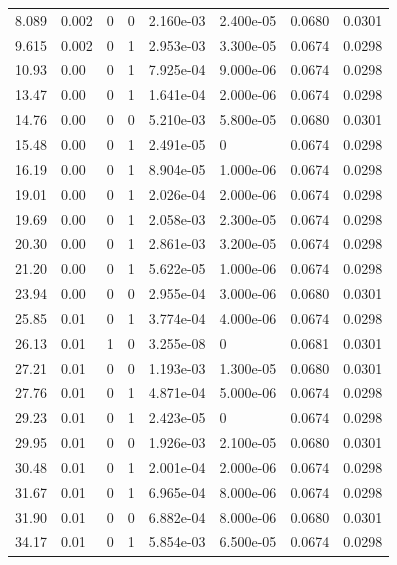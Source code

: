 \documentclass[preview]{standalone}
\begin{document}
{{\begin{tabular}{L{1.2cm}C{1.2cm} C{0.3cm}C{0.5cm} C{1.4cm}C{1.4cm} C{1.4cm}C{1.4cm}}
  8.089  &  0.002  & 0     &  0 &  2.160e-03  & 2.400e-05  & 0.0680 &  0.0301   \\ 
  9.615  &  0.002  & 0     &  1 &  2.953e-03  & 3.300e-05  & 0.0674 &  0.0298   \\ 
  10.93  &  0.00  & 0     &  1 &  7.925e-04  & 9.000e-06  & 0.0674 &  0.0298   \\ 
  13.47  &  0.00  & 0     &  1 &  1.641e-04  & 2.000e-06  & 0.0674 &  0.0298   \\ 
  14.76  &  0.00  & 0     &  0 &  5.210e-03  & 5.800e-05  & 0.0680 &  0.0301   \\ 
  15.48  &  0.00  & 0     &  1 &  2.491e-05  & 0  & 0.0674 &  0.0298   \\ 
  16.19  &  0.00  & 0     &  1 &  8.904e-05  & 1.000e-06  & 0.0674 &  0.0298   \\ 
  19.01  &  0.00  & 0     &  1 &  2.026e-04  & 2.000e-06  & 0.0674 &  0.0298   \\ 
  19.69  &  0.00  & 0     &  1 &  2.058e-03  & 2.300e-05  & 0.0674 &  0.0298   \\ 
  20.30  &  0.00  & 0     &  1 &  2.861e-03  & 3.200e-05  & 0.0674 &  0.0298   \\ 
  21.20  &  0.00  & 0     &  1 &  5.622e-05  & 1.000e-06  & 0.0674 &  0.0298   \\ 
  23.94  &  0.00  & 0     &  0 &  2.955e-04  & 3.000e-06  & 0.0680 &  0.0301   \\ 
  25.85  &  0.01  & 0     &  1 &  3.774e-04  & 4.000e-06  & 0.0674 &  0.0298   \\ 
  26.13  &  0.01  & 1     &  0 &  3.255e-08  & 0  & 0.0681 &  0.0301   \\ 
  27.21  &  0.01  & 0     &  0 &  1.193e-03  & 1.300e-05  & 0.0680 &  0.0301   \\ 
  27.76  &  0.01  & 0     &  1 &  4.871e-04  & 5.000e-06  & 0.0674 &  0.0298   \\ 
  29.23  &  0.01  & 0     &  1 &  2.423e-05  & 0  & 0.0674 &  0.0298   \\ 
  29.95  &  0.01  & 0     &  0 &  1.926e-03  & 2.100e-05  & 0.0680 &  0.0301   \\ 
  30.48  &  0.01  & 0     &  1 &  2.001e-04  & 2.000e-06  & 0.0674 &  0.0298   \\ 
  31.67  &  0.01  & 0     &  1 &  6.965e-04  & 8.000e-06  & 0.0674 &  0.0298   \\ 
  31.90  &  0.01  & 0     &  0 &  6.882e-04  & 8.000e-06  & 0.0680 &  0.0301   \\ 
  34.17  &  0.01  & 0     &  1 &  5.854e-03  & 6.500e-05  & 0.0674 &  0.0298   \\ 

\end{tabular}}}
\end{document}
